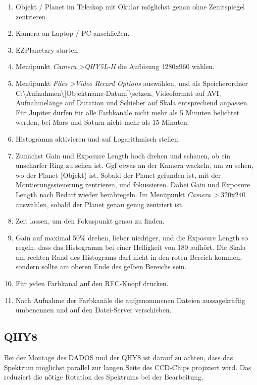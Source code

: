 \documentclass[10pt,a4paper,titlepage]{article}
\begin{document}
\begin{enumerate} 
\item Objekt / Planet im Teleskop mit Okular möglichst genau ohne Zenitspiegel zentrieren.
\item Kamera an Laptop / PC anschließen.
\item EZPlanetary starten
\item Menüpunkt \textit{Camera \textgreater QHY5L-II} die Auflösung 1280x960 wählen.
\item Menüpunkt \textit{Files \textgreater Video Record Options} auswählen, und als Speicherordner C:\textbackslash Aufnahmen\textbackslash [Objektname-Datum]\textbackslash setzen, Videoformat auf AVI. Aufnahmelänge auf Duration und Schieber auf Skala entsprechend anpassen. Für Jupiter dürfen für alle Farbkanäle nicht mehr als 5 Minuten belichtet werden, bei Mars und Saturn nicht mehr als 15 Minuten.
\item Histogramm aktivieren und auf Logarithmisch stellen.
\item Zunächst Gain und Exposure Length hoch drehen und schauen, ob ein unscharfer Ring zu sehen ist. Ggf etwas an der Kamera wackeln, um zu sehen, wo der Planet (Objekt) ist. Sobald der Planet gefunden ist, mit der Montierungssteuerung zentrieren, und fokussieren. Dabei Gain und Exposure Length nach Bedarf wieder herabregeln. Im Menüpunkt \textit{Camera \textgreater} 320x240 auswählen, sobald der Planet genau genug zentriert ist.
\item Zeit lassen, um den Fokuspunkt genau zu finden.
\item Gain auf maximal 50\% drehen, lieber niedriger, und die Exposure Length so regeln, dass das Histogramm bei einer Helligkeit von 180 aufhört. Die Skala am rechten Rand des Histograms darf nicht in den roten Bereich kommen, sondern sollte am oberen Ende des gelben Bereichs sein.
\item Für jeden Farbkanal auf den REC-Knopf drücken.
\item Nach Aufnahme der Farbkanäle die aufgenommenen Dateien aussagekräftig umbenennen und auf den Datei-Server verschieben.
\end{enumerate}

\subsection{QHY8}
Bei der Montage des DADOS und der QHY8 ist darauf zu achten, dass das Spektrum möglichst parallel zur langen Seite des CCD-Chips projiziert wird. Das reduziert die nötige Rotation des Spektrums bei der Bearbeitung.
\end{document}
